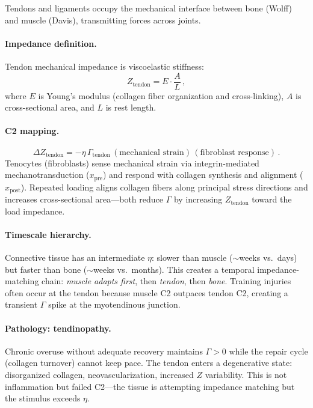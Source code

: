 \documentclass[aps,pre,twocolumn,superscriptaddress,floatfix]{revtex4-2}
\begin{document}
Tendons and ligaments occupy the mechanical interface
between bone (Wolff) and muscle (Davis), transmitting
forces across joints.

\paragraph{Impedance definition.}
Tendon mechanical impedance is viscoelastic stiffness:
\begin{equation}
  Z_{\text{tendon}} = E \cdot \frac{A}{L}\,,
  \label{eq:z-tendon}
\end{equation}
where $E$ is Young's modulus (collagen fiber
organization and cross-linking), $A$ is cross-sectional
area, and $L$ is rest length.

\paragraph{C2 mapping.}
\begin{equation}
  \Delta Z_{\text{tendon}} =
  -\eta\,\Gamma_{\text{tendon}}\,
  (\text{mechanical strain})\,
  (\text{fibroblast response})\,.
  \label{eq:c2-tendon}
\end{equation}
Tenocytes (fibroblasts) sense mechanical strain via
integrin-mediated mechanotransduction ($x_{\text{pre}}$)
and respond with collagen synthesis and
alignment ($x_{\text{post}}$).
Repeated loading aligns collagen fibers along
principal stress directions and increases
cross-sectional area---both reduce $\Gamma$ by
increasing $Z_{\text{tendon}}$ toward the
load impedance.

\paragraph{Timescale hierarchy.}
Connective tissue has an intermediate $\eta$:
slower than muscle ($\sim$weeks vs.\ days) but
faster than bone ($\sim$weeks vs.\ months).
This creates a temporal impedance-matching chain:
\emph{muscle adapts first}, then \emph{tendon},
then \emph{bone}.  Training injuries often occur
at the tendon because muscle C2 outpaces
tendon C2, creating a transient $\Gamma$ spike
at the myotendinous junction.

\paragraph{Pathology: tendinopathy.}
Chronic overuse without adequate recovery maintains
$\Gamma > 0$ while the repair cycle
(collagen turnover) cannot keep pace.
The tendon enters a degenerative state:
disorganized collagen, neovascularization,
increased $Z$ variability.
This is not inflammation but failed C2---the
tissue is attempting impedance matching but
the stimulus exceeds $\eta$.
\end{document}
